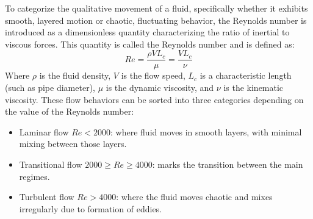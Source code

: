 
To categorize the qualitative movement of a fluid, specifically whether it exhibits smooth, layered motion or chaotic, fluctuating behavior, the Reynolds number is introduced as a dimensionless quantity characterizing the ratio of inertial to viscous forces.
This quantity is called the Reynolds number and is defined as:
\begin{equation}
	Re = \frac{\rho V L_c}{\mu} = \frac{V L_c}{\nu}
	\label{eq:reynolds-number}
\end{equation}
Where $\rho$ is the fluid density, $V$ is the flow speed, $L_c$ is a characteristic length (such as pipe diameter), $\mu$ is the dynamic viscosity, and $\nu$ is the kinematic viscosity.
These flow behaviors can be sorted into three categories depending on the value of the Reynolds number:
\begin{itemize}
	\item Laminar flow $Re < 2000$: where fluid moves in smooth layers, with minimal mixing between those layers.
	\item Transitional flow $2000 \ge Re \ge 4000$: marks the transition between the main regimes.
	\item Turbulent flow $Re > 4000$: where the fluid moves chaotic and mixes irregularly due to formation of eddies.
\end{itemize}
\cite{Cengel2017, anderson2021modern}

